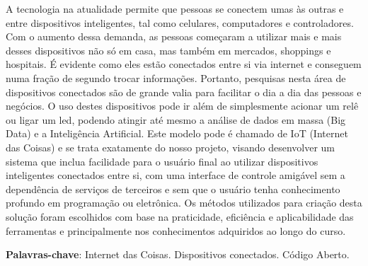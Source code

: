 \documentclass[../../layout.tex]{subfiles}
\begin{document}
\begin{resumo}
\hspace*{3em}

A tecnologia na atualidade permite que pessoas se conectem umas às outras e entre dispositivos inteligentes, tal como celulares, computadores e controladores. Com o aumento dessa demanda, as pessoas começaram a utilizar mais e mais desses dispositivos não só em casa, mas também em mercados, shoppings e hospitais. É evidente como eles estão conectados entre si via internet e conseguem numa fração de segundo trocar informações. Portanto, pesquisas nesta área de dispositivos conectados são de grande valia para facilitar o dia a dia das pessoas e negócios. O uso destes dispositivos pode ir além de simplesmente acionar um relê ou ligar um led, podendo atingir até mesmo a análise de dados em massa (Big Data) e a Inteligência Artificial. Este modelo pode é chamado de IoT (Internet das Coisas) e se trata exatamente do nosso projeto, visando desenvolver um sistema que inclua facilidade para o usuário final ao utilizar dispositivos inteligentes conectados entre si, com uma interface de controle amigável sem a dependência de serviços de terceiros e sem que o usuário tenha conhecimento profundo em programação ou eletrônica. Os métodos utilizados para criação desta solução foram escolhidos com base na praticidade, eficiência e aplicabilidade das ferramentas e principalmente nos conhecimentos adquiridos ao longo do curso.
\vspace{\onelineskip}

\noindent
\textbf{Palavras-chave}: Internet das Coisas. Dispositivos conectados. Código Aberto.
\end{resumo}
\end{document}
